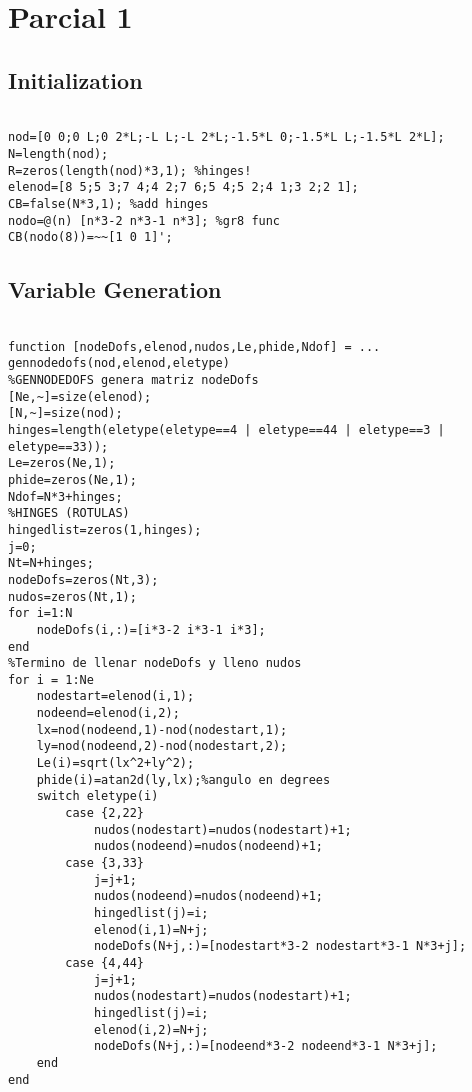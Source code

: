 \bgroup

\section{Parcial 1}

\subsection{Initialization}
\begin{code}
\begin{verbatim}

nod=[0 0;0 L;0 2*L;-L L;-L 2*L;-1.5*L 0;-1.5*L L;-1.5*L 2*L];
N=length(nod);
R=zeros(length(nod)*3,1); %hinges! 
elenod=[8 5;5 3;7 4;4 2;7 6;5 4;5 2;4 1;3 2;2 1];
CB=false(N*3,1); %add hinges
nodo=@(n) [n*3-2 n*3-1 n*3]; %gr8 func
CB(nodo(8))=~~[1 0 1]';
\end{verbatim}
\end{code}

\subsection{Variable Generation}

\begin{code}
\begin{verbatim}

function [nodeDofs,elenod,nudos,Le,phide,Ndof] = ...
gennodedofs(nod,elenod,eletype)
%GENNODEDOFS genera matriz nodeDofs
[Ne,~]=size(elenod);
[N,~]=size(nod);
hinges=length(eletype(eletype==4 | eletype==44 | eletype==3 | eletype==33));
Le=zeros(Ne,1);
phide=zeros(Ne,1);
Ndof=N*3+hinges;
%HINGES (ROTULAS)
hingedlist=zeros(1,hinges);
j=0;
Nt=N+hinges;
nodeDofs=zeros(Nt,3);
nudos=zeros(Nt,1);
for i=1:N
    nodeDofs(i,:)=[i*3-2 i*3-1 i*3];
end
%Termino de llenar nodeDofs y lleno nudos
for i = 1:Ne
    nodestart=elenod(i,1);
    nodeend=elenod(i,2);
    lx=nod(nodeend,1)-nod(nodestart,1);
    ly=nod(nodeend,2)-nod(nodestart,2);
    Le(i)=sqrt(lx^2+ly^2);
    phide(i)=atan2d(ly,lx);%angulo en degrees
    switch eletype(i)
        case {2,22}
            nudos(nodestart)=nudos(nodestart)+1;
            nudos(nodeend)=nudos(nodeend)+1;
        case {3,33}
            j=j+1;
            nudos(nodeend)=nudos(nodeend)+1;
            hingedlist(j)=i; 
            elenod(i,1)=N+j;
            nodeDofs(N+j,:)=[nodestart*3-2 nodestart*3-1 N*3+j];
        case {4,44}
            j=j+1;
            nudos(nodestart)=nudos(nodestart)+1;
            hingedlist(j)=i; 
            elenod(i,2)=N+j;
            nodeDofs(N+j,:)=[nodeend*3-2 nodeend*3-1 N*3+j];
    end
end
\end{verbatim}%
\end{code}

